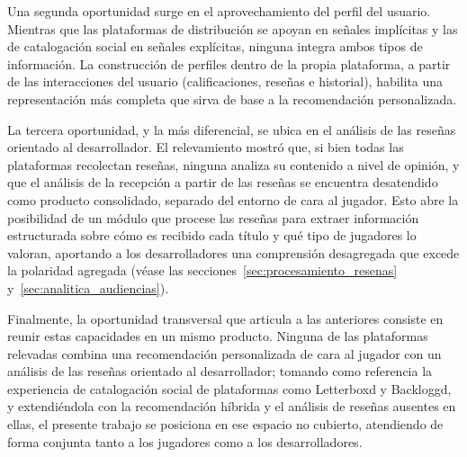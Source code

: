 Una segunda oportunidad surge en el aprovechamiento del perfil del usuario. Mientras que las plataformas de distribución se apoyan en señales implícitas y las de catalogación social en señales explícitas, ninguna integra ambos tipos de información. La construcción de perfiles dentro de la propia plataforma, a partir de las interacciones del usuario (calificaciones, reseñas e historial), habilita una representación más completa que sirva de base a la recomendación personalizada.

La tercera oportunidad, y la más diferencial, se ubica en el análisis de las reseñas orientado al desarrollador. El relevamiento mostró que, si bien todas las plataformas recolectan reseñas, ninguna analiza su contenido a nivel de opinión, y que el análisis de la recepción a partir de las reseñas se encuentra desatendido como producto consolidado, separado del entorno de cara al jugador. Esto abre la posibilidad de un módulo que procese las reseñas para extraer información estructurada sobre cómo es recibido cada título y qué tipo de jugadores lo valoran, aportando a los desarrolladores una comprensión desagregada que excede la polaridad agregada (véase las secciones~\ref{sec:procesamiento_resenas} y~\ref{sec:analitica_audiencias}).

Finalmente, la oportunidad transversal que articula a las anteriores consiste en reunir estas capacidades en un mismo producto. Ninguna de las plataformas relevadas combina una recomendación personalizada de cara al jugador con un análisis de las reseñas orientado al desarrollador; tomando como referencia la experiencia de catalogación social de plataformas como Letterboxd y Backloggd, y extendiéndola con la recomendación híbrida y el análisis de reseñas ausentes en ellas, el presente trabajo se posiciona en ese espacio no cubierto, atendiendo de forma conjunta tanto a los jugadores como a los desarrolladores.
